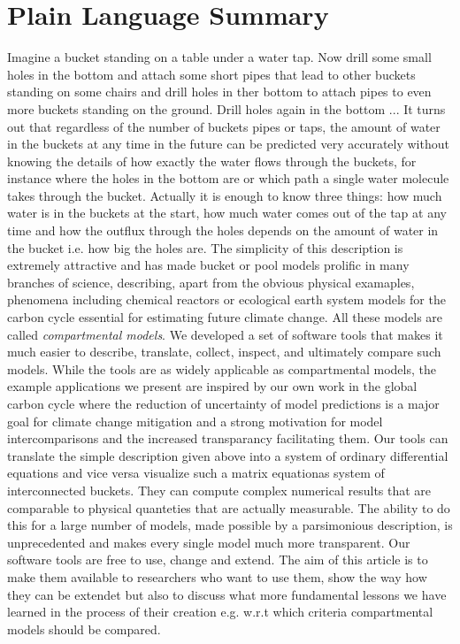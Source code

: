 \section*{Plain Language Summary} 
Imagine a bucket standing on a table under a
water tap. Now drill some small holes in the bottom and attach some short pipes
that lead to other buckets standing on some chairs and drill holes in ther
bottom to attach pipes to even more buckets standing on the ground. Drill holes
again in the bottom ...
It turns out that regardless of the number of buckets pipes or taps, the amount of water in the buckets at
any time in the future can be predicted very accurately without knowing the
details of how exactly the water flows through the buckets, for instance where
the holes in the bottom are or which path a single water molecule takes
through the bucket.  Actually it is enough to know three things: how
much water is in the buckets at the start, how much water comes out of the tap
at any time and how the outflux through the holes depends on the amount of
water in the bucket i.e. how big the holes are.  
The simplicity of this description is extremely attractive and has made bucket or pool models prolific in many
branches of science, describing, apart from the obvious physical examaples, phenomena including  chemical reactors or
ecological earth system models for the carbon cycle essential for estimating future climate change.
All these models are called \emph{compartmental models}.  
We developed a set of software tools that makes it much easier to describe, translate, collect, inspect, and ultimately compare such models.  
While the tools are as widely applicable as compartmental models, the example applications we present are inspired by our own work in the global carbon cycle where the reduction of uncertainty of model predictions is a major goal for climate change mitigation and a strong motivation for model intercomparisons and the increased transparancy facilitating them. 
Our tools can translate the simple description given above into a system of ordinary differential equations and vice versa visualize such a matrix  equationas system of interconnected buckets. They can compute complex numerical results that are comparable to physical quanteties that are actually measurable. 
The ability to do this for a large number of models, made possible by a parsimonious description, is unprecedented and makes every single model much more transparent. 
Our software tools are free to use, change and extend.
The aim of this article is to make them available to researchers who want to use them, show the way how they can be extendet but also to discuss what more fundamental lessons we have learned in the process of their creation e.g. w.r.t which criteria compartmental models should be compared.
%
%


